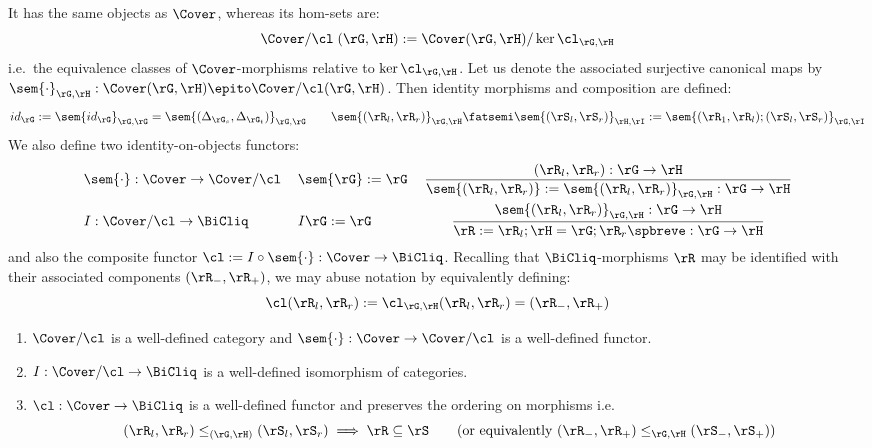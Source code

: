 \documentclass{article}
\begin{document}
\begin{definition}
It has the same objects as $\Cover$, whereas its hom-sets are:
\[
\Cover/\cl\;(\rG,\rH) := \Cover(\rG,\rH)/\ker{\cl_{\rG,\rH}}
\]
i.e.\ the equivalence classes of $\Cover$-morphisms relative to $\ker{\cl_{\rG,\rH}}$. Let us denote the associated surjective canonical maps by $\sem{\cdot}_{\rG,\rH} : \Cover(\rG,\rH) \epito \Cover/\cl (\rG,\rH)$. Then identity morphisms and composition are defined:
\[
id_\rG := \sem{id_\rG}_{\rG,\rG} = \sem{(\Delta_{\rG_s},\Delta_{\rG_t})}_{\rG,\rG}
\qquad
\sem{(\rR_l,\rR_r)}_{\rG,\rH} \fatsemi \sem{(\rS_l,\rS_r)}_{\rH,\rI}
:= \sem{(\rR_1,\rR_l) ; (\rS_l,\rS_r)}_{\rG,\rI}
\]
We also define two identity-on-objects functors:
\[
\begin{tabular}{llc}
$\sem{\cdot} : \Cover \to \Cover/\cl$
&
$\sem{\rG} := \rG$
&
$\dfrac{(\rR_l,\rR_r) : \rG \to \rH}{\sem{(\rR_l,\rR_r)} := \sem{(\rR_l,\rR_r)}_{\rG,\rH}  : \rG \to \rH}$
\\[2.5ex]
$I : \Cover/\cl \to \BiCliq$
&
$I\rG := \rG$
&
$\dfrac{\sem{(\rR_l,\rR_r)}_{\rG,\rH} : \rG \to \rH}{\rR := \rR_l ; \rH = \rG ; \rR_r\spbreve : \rG \to \rH}$
\end{tabular}
\]
and also the composite functor $\cl := I \circ \sem{\cdot} : \Cover \to \BiCliq$. Recalling that $\BiCliq$-morphisms $\rR$ may be identified with their associated components $(\rR_-,\rR_+)$, we may abuse notation by equivalently defining:
\[
\cl (\rR_l,\rR_r) := \cl_{\rG,\rH}(\rR_l,\rR_r) = (\rR_-,\rR_+)
\]
\endbox
\end{definition}

\begin{theorem}
\item
\begin{enumerate}
\item
$\Cover/\cl$ is a well-defined category and $\sem{\cdot} : \Cover \to \Cover/\cl$ is a well-defined functor.
\item
$I : \Cover/\cl \to \BiCliq$ is a well-defined isomorphism of categories.
\item
$\cl : \Cover \to \BiCliq$ is a well-defined functor and preserves the  ordering on morphisms i.e.\
\[
(\rR_l,\rR_r) \leq_{(\rG,\rH)} (\rS_l,\rS_r)
\implies \rR \subseteq \rS
\qquad
\text{(or equivalently $(\rR_-,\rR_+) \leq_{\rG,\rH} (\rS_-,\rS_+)$)}
\]
\end{enumerate}
\end{theorem}
\end{document}

